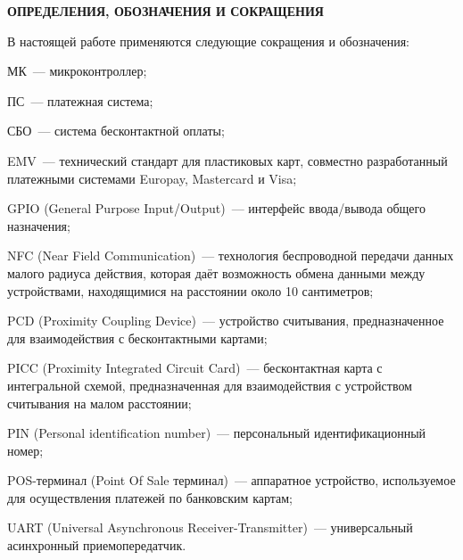 \newpage

\begin{center}
	\textbf{ОПРЕДЕЛЕНИЯ, ОБОЗНАЧЕНИЯ И СОКРАЩЕНИЯ}
\end{center}

В настоящей работе применяются следующие сокращения и обозначения:

\begin{description}

	\item МК~--- микроконтроллер;
	\item ПС~--- платежная система;
	\item СБО~--- система бесконтактной оплаты;

	\item EMV~--- технический стандарт для пластиковых карт, совместно разработанный платежными системами Europay, Mastercard и Visa;
	\item GPIO (General Purpose Input/Output)~--- интерфейс ввода/вывода общего назначения;
	\item NFC (Near Field Communication)~--- технология беспроводной передачи данных малого радиуса действия, которая даёт возможность обмена данными между устройствами, находящимися на расстоянии около 10 сантиметров;
	\item PCD (Proximity Coupling Device)~--- устройство считывания, предназначенное для взаимодействия с бесконтактными картами;
	\item PICC (Proximity Integrated Circuit Card)~--- бесконтактная карта с интегральной схемой, предназначенная для взаимодействия с устройством считывания на малом расстоянии;
	\item PIN (Personal identification number)~--- персональный идентификационный номер;
	\item POS-терминал (Point Of Sale терминал)~--- аппаратное устройство, используемое для осуществления платежей по банковским картам;
	\item UART (Universal Asynchronous Receiver-Transmitter)~--- универсальный асинхронный приемопередатчик.

\item \end{description}
